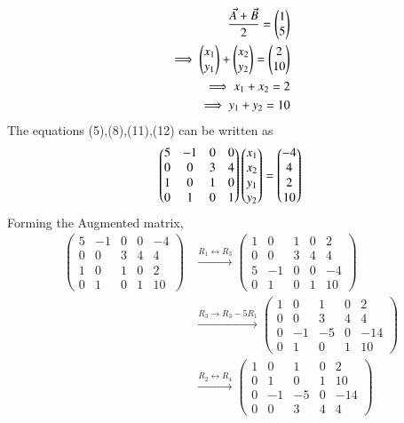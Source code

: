 \documentclass[journal]{IEEEtran}
\begin{document}
\begin{align}
  \frac{\Vec{A}+\Vec{B}}{2}=\begin{pmatrix}1\\5\end{pmatrix}\\
  \implies \begin{pmatrix}x_1\\y_1\end{pmatrix}+\begin{pmatrix}x_2\\y_2\end{pmatrix}=\begin{pmatrix}2\\10\end{pmatrix}\\
  \implies x_1+x_2=2\\
  \implies y_1+y_2=10
\end{align}
The equations (5),(8),(11),(12) can be written as
\begin{align}
    \begin{pmatrix}
        5 & -1 & 0 & 0\\
        0 & 0 & 3 & 4\\
        1 & 0 & 1 & 0\\
        0 & 1 & 0 & 1
    \end{pmatrix} \begin{pmatrix}x_1\\x_2\\y_1\\y_2\end{pmatrix}=\begin{pmatrix}-4\\4\\2\\10\end{pmatrix}\\
\end{align}
Forming the Augmented matrix,
\begin{align}
\left(\begin{array}{cccc|c}
        5 & -1 & 0 & 0 & -4\\
        0 & 0 & 3 & 4 & 4\\
        1 & 0 & 1 & 0 & 2\\
        0 & 1 & 0 & 1 & 10
\end{array}\right) &\xrightarrow{R_1 \leftrightarrow R_3} \left(\begin{array}{cccc|c}
        1 & 0 & 1 & 0 & 2\\
        0 & 0 & 3 & 4 & 4\\
        5 & -1 & 0 & 0 & -4\\
        0 & 1 & 0 & 1 & 10
\end{array}\right)\\
 &\xrightarrow{R_3 \rightarrow R_3-5R_1} \left(\begin{array}{cccc|c}
        1 & 0 & 1 & 0 & 2\\
        0 & 0 & 3 & 4 & 4\\
        0 & -1 & -5 & 0 & -14\\
        0 & 1 & 0 & 1 & 10
\end{array}\right)\\
 &\xrightarrow{R_2 \leftrightarrow R_4} \left(\begin{array}{cccc|c}
        1 & 0 & 1 & 0 & 2\\
        0 & 1 & 0 & 1 & 10\\
        0 & -1 & -5 & 0 & -14\\
        0 & 0 & 3 & 4 & 4
\end{array}\right)\\
\end{align}
\end{document}
